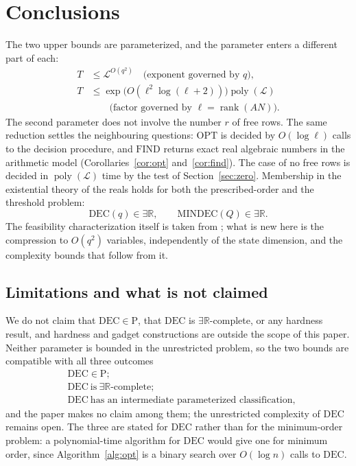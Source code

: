 \documentclass[journal]{IEEEtran}
\theoremstyle{plainn}
\theoremstyle{remark}
\begin{document}
\section{Conclusions}\label{sec:conclusions}

The two upper bounds are parameterized, and the parameter enters a different part of each:
\begin{equation*}
\begin{aligned}
T&\le\mathcal L^{O(q^2)}\quad\text{(exponent governed by }q\text{)},\\
T&\le\exp\bigl(O(\ell^2\log(\ell+2))\bigr)\operatorname{poly}(\mathcal L)\\
&\qquad\text{(factor governed by }\ell=\operatorname{rank}(AN)\text{)}.
\end{aligned}
\end{equation*}
The second parameter does not involve the number $r$ of free rows. The same reduction
settles the neighbouring questions: $\mathrm{OPT}$ is decided by $O(\log\ell)$ calls to the
decision procedure, and $\mathrm{FIND}$ returns exact real algebraic numbers in the arithmetic
model (Corollaries~\ref{cor:opt} and~\ref{cor:find}).
The case of no free rows is decided in $\operatorname{poly}(\mathcal L)$ time by the test of Section~\ref{sec:zero}. Membership in the existential theory of the reals holds for both the prescribed-order and the threshold problem:
\begin{equation*}
\mathrm{DEC}(q)\in\exists\mathbb R,\qquad \mathrm{MINDEC}(Q)\in\exists\mathbb R .
\end{equation*}
The feasibility characterization itself is taken from \cite{fer10,dar25,fer26a,fer26b}; what is new here is the compression to $O(q^2)$ variables, independently of the state dimension, and the complexity bounds that follow from it.

\subsection{Limitations and what is not claimed}\label{sec:limits}

We do not claim that $\mathrm{DEC}\in\mathrm P$, that $\mathrm{DEC}$ is
$\exists\mathbb R$-complete, or any hardness result, and hardness and gadget constructions are
outside the scope of this paper. Neither parameter is bounded in the unrestricted problem, so the
two bounds are compatible with all three outcomes
\begin{equation*}
\begin{aligned}
&\mathrm{DEC}\in\mathrm P;\\
&\mathrm{DEC}\ \text{is}\ \exists\mathbb R\text{-complete};\\
&\mathrm{DEC}\ \text{has an intermediate parameterized classification},
\end{aligned}
\end{equation*}
and the paper makes no claim among them; the unrestricted complexity of $\mathrm{DEC}$ remains
open. The three are stated for $\mathrm{DEC}$ rather than for the minimum-order problem: a
polynomial-time algorithm for $\mathrm{DEC}$ would give one for minimum order, since
Algorithm~\ref{alg:opt} is a binary search over $O(\log n)$ calls to $\mathrm{DEC}$.
\end{document}
